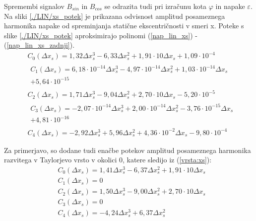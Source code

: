 \newpage
Spremembi signalov $B_{sin}$ in $B_{cos}$ se odrazita tudi pri izračunu kota $\varphi$ in napake $\varepsilon$.
Na sliki \ref{./LIN/xs_potek} je prikazana odvisnost amplitud posameznega harmonika napake od spreminjanja statične ekscentričnosti v smeri x. Poteke s slike \ref{./LIN/xs_potek} aproksimirajo polinomi (\ref{nap_lin_xs}) - (\ref{nap_lin_xs_zadnji}).
\begin{eqnarray}
\label{nap_lin_xs}
&C_0(\Delta x_s) =1,32\Delta x_s^{3}-6,33\Delta x_s^{2}+1,91\cdot 10\Delta x_s+1,09\cdot 10^{-4} \\                                    
&\begin{split}C_1(\Delta x_s) =6,18\cdot 10^{-14}\Delta x_s^{3}-4,97\cdot 10^{-14}\Delta x_s^{2}+1,03\cdot 10^{-14}\Delta x_s\\+5,64\cdot 10^{-15} \end{split}\\ 
&C_2(\Delta x_s) =1,71\Delta x_s^{3}-9,04\Delta x_s^{2}+2,70\cdot 10\Delta x_s-5,20\cdot 10^{-5} \\                                    
&\begin{split}C_3(\Delta x_s) =-2,07\cdot 10^{-14}\Delta x_s^{3}+2,00\cdot 10^{-14}\Delta x_s^{2}-3,76\cdot 10^{-15}\Delta x_s\\+4,81\cdot 10^{-16} \end{split}\\
\label{nap_lin_xs_zadnji}
&C_4(\Delta x_s) =-2,92\Delta x_s^{3}+5,96\Delta x_s^{2}+4,36\cdot 10^{-2}\Delta x_s-9,80\cdot 10^{-4}
\end{eqnarray}

Za primerjavo, so dodane tudi enačbe potekov amplitud posameznega harmonika razvitega v Taylorjevo vrsto v okolici 0, katere sledijo iz (\ref{vrsta:xs}):
\begin{eqnarray}
&C_0(\Delta x_s) =1,41\Delta x_s^{3}-6,37\Delta x_s^{2}+1,91\cdot 10\Delta x_s \\
&C_1(\Delta x_s) = 0\\
&C_2(\Delta x_s) =1,50\Delta x_s^{3}-9,00\Delta x_s^{2}+2,70\cdot 10\Delta x_s\\
&C_3(\Delta x_s) = 0\\
&C_4(\Delta x_s) =-4,24\Delta x_s^{3}+6,37\Delta x_s^{2}
\end{eqnarray}

